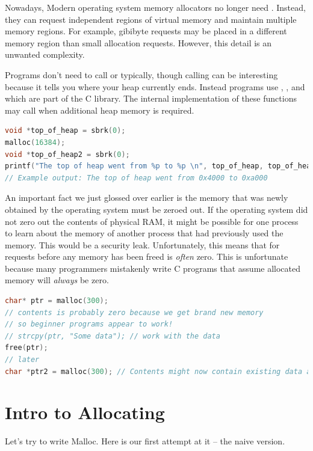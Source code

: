 Nowadays, Modern operating system memory allocators no longer need .
Instead, they can request independent regions of virtual memory and maintain multiple memory regions.
For example, gibibyte requests may be placed in a different memory region than small allocation requests.
However, this detail is an unwanted complexity.

Programs don't need to call  or  typically, though calling  can be interesting because it tells you where your heap currently ends.
Instead programs use , ,  and  which are part of the C library.
The internal implementation of these functions may call  when additional heap memory is required.

\begin{lstlisting}[language=C]
void *top_of_heap = sbrk(0);
malloc(16384);
void *top_of_heap2 = sbrk(0);
printf("The top of heap went from %p to %p \n", top_of_heap, top_of_heap2);
// Example output: The top of heap went from 0x4000 to 0xa000
\end{lstlisting}

An important fact we just glossed over earlier is the memory that was newly obtained by the operating system must be zeroed out.
If the operating system did not zero out the contents of physical RAM, it might be possible for one process to learn about the memory of another process that had previously used the memory.
This would be a security leak.
Unfortunately, this means that for  requests before any memory has been freed is \emph{often} zero.
This is unfortunate because many programmers mistakenly write C programs that assume allocated memory will \emph{always} be zero.

\begin{lstlisting}[language=C]
char* ptr = malloc(300);
// contents is probably zero because we get brand new memory
// so beginner programs appear to work!
// strcpy(ptr, "Some data"); // work with the data
free(ptr);
// later
char *ptr2 = malloc(300); // Contents might now contain existing data and is probably not zero
\end{lstlisting}

\section{Intro to Allocating}

Let's try to write Malloc.
Here is our first attempt at it -- the naive version.

